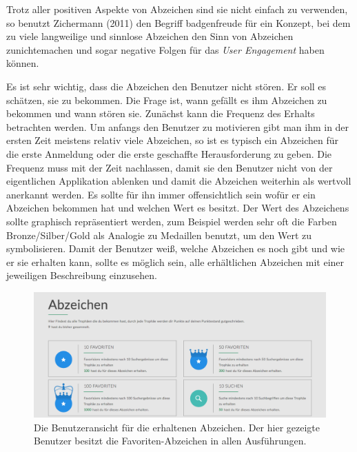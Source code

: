 \documentclass[12pt,twoside]{book}
\begin{document}
Trotz aller positiven Aspekte von Abzeichen sind sie nicht einfach zu verwenden, so benutzt Zichermann (2011) \citep[pp. 56]{zichermann2011gamification} den Begriff \glqq badgenfreude\grqq{} für ein Konzept, bei dem zu viele langweilige und sinnlose Abzeichen den Sinn von Abzeichen zunichtemachen und sogar negative Folgen für das \textit{User Engagement} haben können.

Es ist sehr wichtig, dass die Abzeichen den Benutzer nicht stören. Er soll es schätzen, sie zu bekommen. Die Frage ist, wann gefällt es ihm Abzeichen zu bekommen und wann stören sie.
Zunächst kann die Frequenz des Erhalts betrachten werden. Um anfangs den Benutzer zu motivieren gibt man ihm in der ersten Zeit meistens relativ viele Abzeichen, so ist es typisch ein Abzeichen für die erste Anmeldung oder die erste geschaffte Herausforderung zu geben.
Die Frequenz muss mit der Zeit nachlassen, damit sie den Benutzer nicht von der eigentlichen Applikation ablenken und damit die Abzeichen weiterhin als wertvoll anerkannt werden.
Es sollte für ihn immer offensichtlich sein wofür er ein Abzeichen bekommen hat und welchen Wert es besitzt. Der Wert des Abzeichens sollte graphisch repräsentiert werden, zum Beispiel werden sehr oft die Farben Bronze/Silber/Gold als Analogie zu Medaillen benutzt, um den Wert zu symbolisieren.
Damit der Benutzer weiß, welche Abzeichen es noch gibt und wie er sie erhalten kann, sollte es möglich sein, alle erhältlichen Abzeichen mit einer jeweiligen Beschreibung einzusehen.

\begin{figure}[htbp]
    \centering
    \includegraphics[width=1.0\textwidth]{images/infoboard_badges.png}
    \caption{Die Benutzeransicht für die erhaltenen Abzeichen. Der hier gezeigte Benutzer besitzt die Favoriten-Abzeichen in allen Ausführungen.}
    \label{fig:badges}
\end{figure}
\end{document}
